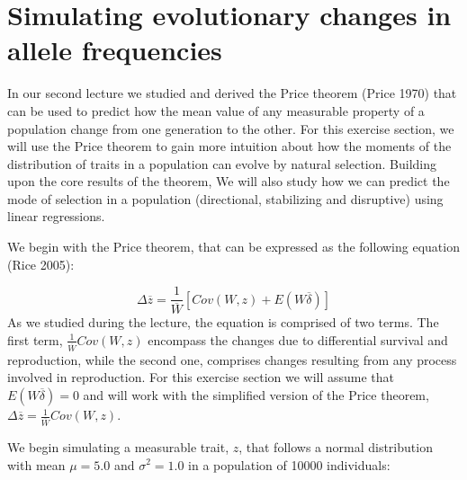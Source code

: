 \documentclass[
]{book}
\begin{document}
\hypertarget{simulating-evolutionary-changes-in-allele-frequencies-1}{%
\section{Simulating evolutionary changes in allele frequencies}\label{simulating-evolutionary-changes-in-allele-frequencies-1}}

In our second lecture we studied and derived the Price theorem (Price 1970) that can be used to predict how the mean value of any measurable property of a population change from one generation to the other. For this exercise section, we will use the Price theorem to gain more intuition about how the moments of the distribution of traits in a population can evolve by natural selection. Building upon the core results of the theorem, We will also study how we can predict the mode of selection in a population (directional, stabilizing and disruptive) using linear regressions.

We begin with the Price theorem, that can be expressed as the following equation (Rice 2005):

\[
\Delta \overline{z}=\frac{1}{\overline{W}}\left[Cov(W, z) + E(W\overline{\delta}) \right]
\] As we studied during the lecture, the equation is comprised of two terms. The first term, \(\frac{1}{\overline{W}}Cov(W, z)\) encompass the changes due to differential survival and reproduction, while the second one, comprises changes resulting from any process involved in reproduction. For this exercise section we will assume that \(E(W\overline{\delta})=0\) and will work with the simplified version of the Price theorem, \(\Delta \overline{z}=\frac{1}{\overline{W}}Cov(W, z)\).

We begin simulating a measurable trait, \(z\), that follows a normal distribution with mean \(\mu=5.0\) and \(\sigma^2=1.0\) in a population of 10000 individuals:
\end{document}

